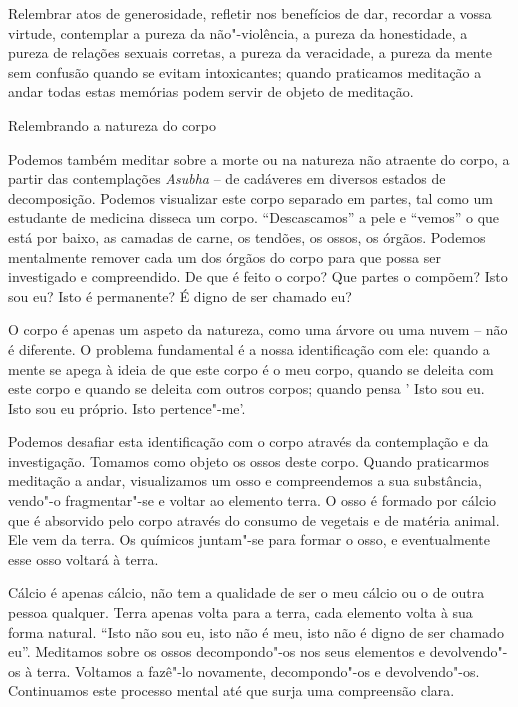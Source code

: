 Relembrar atos de generosidade, refletir nos benefícios de dar, recordar
a vossa virtude, contemplar a pureza da não"-violência, a pureza da
honestidade, a pureza de relações sexuais corretas, a pureza da
veracidade, a pureza da mente sem confusão quando se evitam
intoxicantes; quando praticamos meditação a andar todas estas memórias
podem servir de objeto de meditação.

\begin{siderule-quote}
  Relembrando a natureza do corpo
\end{siderule-quote}

Podemos também meditar sobre a morte ou na natureza não atraente do
corpo, a partir das contemplações \emph{Asubha} -- de cadáveres em
diversos estados de decomposição. Podemos visualizar este corpo separado
em partes, tal como um estudante de medicina disseca um corpo.
``Descascamos'' a pele e ``vemos'' o que está por baixo, as camadas de
carne, os tendões, os ossos, os órgãos. Podemos mentalmente remover cada
um dos órgãos do corpo para que possa ser investigado e compreendido. De
que é feito o corpo? Que partes o compõem? Isto sou eu? Isto é
permanente? É digno de ser chamado eu?

O corpo é apenas um aspeto da natureza, como uma árvore ou uma nuvem --
não é diferente. O problema fundamental é a nossa identificação com ele:
quando a mente se apega à ideia de que este corpo é o meu corpo, quando
se deleita com este corpo e quando se deleita com outros corpos; quando
pensa ' Isto sou eu. Isto sou eu próprio. Isto pertence"-me'.

Podemos desafiar esta identificação com o corpo através da contemplação
e da investigação. Tomamos como objeto os ossos deste corpo. Quando
praticarmos meditação a andar, visualizamos um osso e compreendemos a
sua substância, vendo"-o fragmentar"-se e voltar ao elemento terra. O osso
é formado por cálcio que é absorvido pelo corpo através do consumo de
vegetais e de matéria animal. Ele vem da terra. Os químicos juntam"-se
para formar o osso, e eventualmente esse osso voltará à terra.

Cálcio é apenas cálcio, não tem a qualidade de ser o meu cálcio ou o de
outra pessoa qualquer. Terra apenas volta para a terra, cada elemento
volta à sua forma natural. ``Isto não sou eu, isto não é meu, isto não é
digno de ser chamado eu''. Meditamos sobre os ossos decompondo"-os nos
seus elementos e devolvendo"-os à terra. Voltamos a fazê"-lo novamente,
decompondo"-os e devolvendo"-os. Continuamos este processo mental até que
surja uma compreensão clara.

